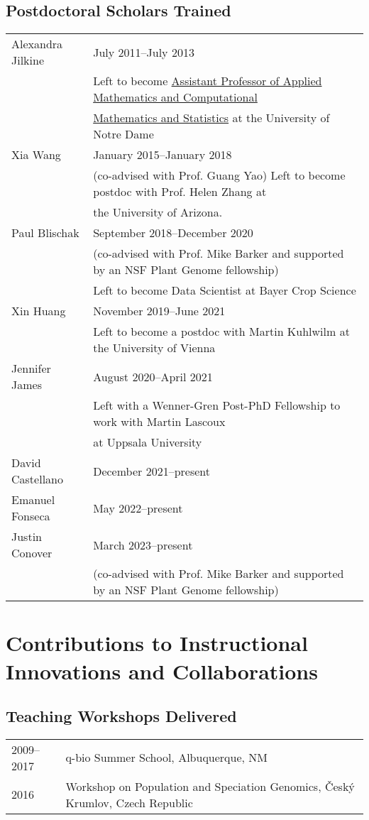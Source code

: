 \documentclass[11pt]{article}
\begin{document}
\subsection*{Postdoctoral Scholars Trained}
\begin{longtable}[l]{l l}
Alexandra Jilkine & July 2011--July 2013\\
                  & Left to become \href{https://acms.nd.edu/people/alexandra-jilkine/}{Assistant Professor of Applied Mathematics and Computational}\\
                  &\href{https://acms.nd.edu/people/alexandra-jilkine/}{Mathematics and Statistics} at the University of Notre Dame\\
Xia Wang & January 2015--January 2018\\
		& (co-advised with Prof. Guang Yao) Left to become postdoc with Prof. Helen Zhang at\\ &the University of Arizona.\\
Paul Blischak & September 2018--December 2020\\
		& (co-advised with Prof. Mike Barker and supported by an NSF Plant Genome fellowship)\\
		& Left to become Data Scientist at Bayer Crop Science\\
Xin Huang & November 2019--June 2021\\
                & Left to become a postdoc with Martin Kuhlwilm at the University of Vienna\\
Jennifer James & August 2020--April 2021\\
		& Left with a Wenner-Gren Post-PhD Fellowship to work with Martin Lascoux\\
		& at Uppsala University\\
David Castellano & December 2021--present\\
Emanuel Fonseca & May 2022--present\\
Justin Conover & March 2023--present\\
& (co-advised with Prof. Mike Barker and supported by an NSF Plant Genome fellowship)\\
\end{longtable}

\section*{Contributions to Instructional Innovations and Collaborations}
\subsection*{Teaching Workshops Delivered}
\begin{longtable}[l]{l l}
2009--2017 & q-bio Summer School, Albuquerque, NM\\
2016 & Workshop on Population and Speciation Genomics, \v{C}esk\'{y} Krumlov, Czech Republic
\end{longtable}
\end{document}
